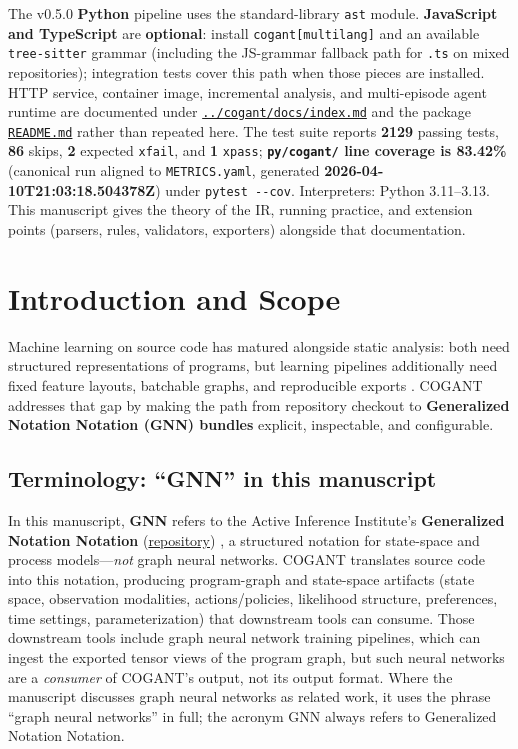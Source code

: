 \documentclass[
]{article}
\begin{document}
The v0.5.0 \textbf{Python} pipeline uses the standard-library
\texttt{ast} module. \textbf{JavaScript and TypeScript} are
\textbf{optional}: install \texttt{cogant{[}multilang{]}} and an
available \texttt{tree-sitter} grammar (including the JS-grammar
fallback path for \texttt{.ts} on mixed repositories); integration tests
cover this path when those pieces are installed. HTTP service, container
image, incremental analysis, and multi-episode agent runtime are
documented under
\href{../cogant/docs/index.md}{\texttt{../cogant/docs/index.md}} and the
package \href{../cogant/README.md}{\texttt{README.md}} rather than
repeated here. The test suite reports \textbf{2129} passing tests,
\textbf{86} skips, \textbf{2} expected \texttt{xfail}, and \textbf{1}
\texttt{xpass}; \textbf{\texttt{py/cogant/} line coverage is 83.42\%}
(canonical run aligned to \texttt{METRICS.yaml}, generated
\textbf{2026-04-10T21:03:18.504378Z}) under \texttt{pytest\ -\/-cov}.
Interpreters: Python 3.11--3.13. This manuscript gives the theory of the
IR, running practice, and extension points (parsers, rules, validators,
exporters) alongside that documentation.

\newpage

\section{Introduction and Scope}\label{introduction-and-scope}

Machine learning on source code has matured alongside static analysis:
both need structured representations of programs, but learning pipelines
additionally need fixed feature layouts, batchable graphs, and
reproducible exports \citep{allamanis2018survey}. COGANT addresses that
gap by making the path from repository checkout to \textbf{Generalized
Notation Notation (GNN) bundles} explicit, inspectable, and
configurable.

\subsection{Terminology: ``GNN'' in this
manuscript}\label{terminology-gnn-in-this-manuscript}

In this manuscript, \textbf{GNN} refers to the Active Inference
Institute's \textbf{Generalized Notation Notation}
(\href{https://github.com/ActiveInferenceInstitute/GeneralizedNotationNotation}{repository})
\citep{friedman2024gnn}, a structured notation for state-space and
process models---\emph{not} graph neural networks. COGANT translates
source code into this notation, producing program-graph and state-space
artifacts (state space, observation modalities, actions/policies,
likelihood structure, preferences, time settings, parameterization) that
downstream tools can consume. Those downstream tools include graph
neural network training pipelines, which can ingest the exported tensor
views of the program graph, but such neural networks are a
\emph{consumer} of COGANT's output, not its output format. Where the
manuscript discusses graph neural networks as related work, it uses the
phrase ``graph neural networks'' in full; the acronym GNN always refers
to Generalized Notation Notation.
\end{document}
